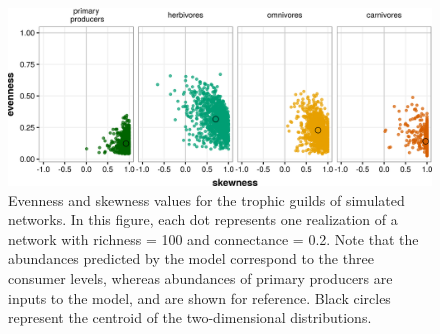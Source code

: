 \begin{figure}[htbp!]
\includegraphics[width=\textwidth,height=\textheight,keepaspectratio]{./Figures/chapter04/Fig_3.png}
\caption[Model evenness and skewness]{\color{Gray}Evenness and skewness values for the trophic guilds of simulated networks. In this figure, each dot represents one realization of a network with richness = 100 and connectance = 0.2. Note that the abundances predicted by the model correspond to the three consumer levels, whereas abundances of primary producers are inputs to the model, and are shown for reference. Black circles represent the centroid of the two-dimensional distributions.}\label{fig:fig4.3}
\end{figure}

